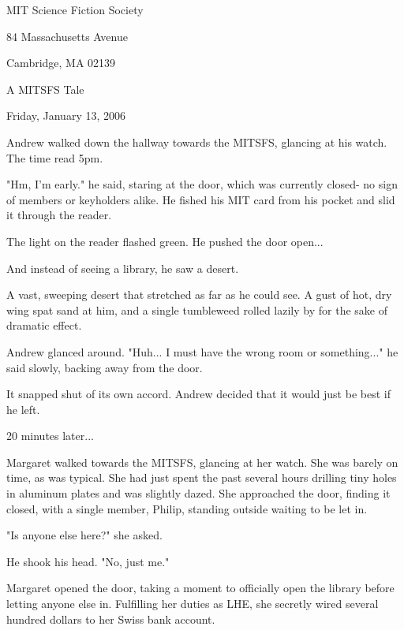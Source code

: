 \documentclass[10pt]{article}
\begin{document}
\begin{center}

MIT Science Fiction Society 

84 Massachusetts Avenue

Cambridge, MA 02139

\vspace{12pt}

A MITSFS Tale 

Friday, January 13, 2006

\end{center}
 
\vspace{18pt}

\setlength{\parskip}{6pt}

Andrew walked down the hallway towards the MITSFS, glancing at his watch. The time read 5pm.

"Hm, I'm early." he said, staring at the door, which was currently closed- no sign of members or keyholders alike. He fished his MIT card from his pocket and slid it through the reader.

The light on the reader flashed green. He pushed the door open...

And instead of seeing a library, he saw a desert.

A vast, sweeping desert that stretched as far as he could see. A gust of hot, dry wing spat sand at him, and a single tumbleweed rolled lazily by for the sake of dramatic effect.

Andrew glanced around. "Huh... I must have the wrong room or something..." he said slowly, backing away from the door.

It snapped shut of its own accord. Andrew decided that it would just be best if he left.

20 minutes later...

Margaret walked towards the MITSFS, glancing at her watch. She was barely on time, as was typical. She had just spent the past several hours drilling tiny holes in aluminum plates and was slightly dazed. She approached the door, finding it closed, with a single member, Philip, standing outside waiting to be let in.

"Is anyone else here?" she asked.

He shook his head. "No, just me."

Margaret opened the door, taking a moment to officially open the library before letting anyone else in. Fulfilling her duties as LHE, she secretly wired several hundred dollars to her Swiss bank account.
\end{document}
